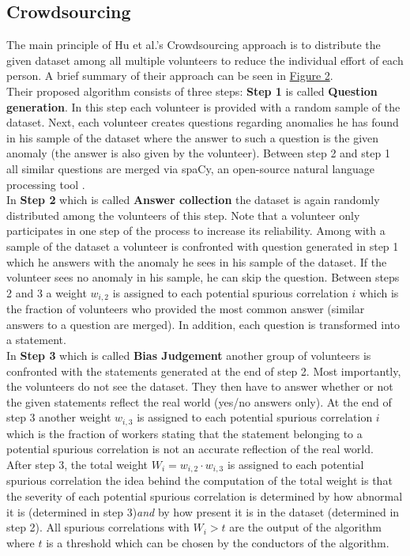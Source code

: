 \documentclass{article}
\begin{document}
\subsection{Crowdsourcing}
The main principle of Hu et al.'s Crowdsourcing approach \cite{10.1145/3366423.3380063} is to distribute the given dataset among all multiple volunteers to reduce the individual effort of each person. A brief summary of their approach can be seen in \hyperref[fig:crowdsourcing]{Figure 2}. \\
Their proposed algorithm consists of three steps: \textbf{Step 1} is called \textbf{Question generation}. In this step each volunteer is provided with a random sample of the dataset. Next, each volunteer creates questions regarding anomalies he has found in his sample of the dataset where the answer to such a question is the given anomaly (the answer is also given by the volunteer). Between step 2 and step 1 all similar questions are merged via spaCy, an open-source natural language processing tool \cite{spaCy}. \\
In \textbf{Step 2} which is called \textbf{Answer collection} the dataset is again randomly distributed among the volunteers of this step. Note that a volunteer only participates in one step of the process to increase its reliability. Among with a sample of the dataset a volunteer is confronted with question generated in step 1 which he answers with the anomaly he sees in his sample of the dataset. If the volunteer sees no anomaly in his sample, he can skip the question. Between steps 2 and 3 a weight $w_{i,2}$ is assigned to each potential spurious correlation $i$ which is the fraction of volunteers who provided the most common answer (similar answers to a question are merged). In addition, each question is transformed into a statement. \\
In \textbf{Step 3} which is called \textbf{Bias Judgement} another group of volunteers is confronted with the statements generated at the end of step 2. Most importantly, the volunteers do not see the dataset. They then have to answer whether or not the given statements reflect the real world (yes/no answers only). At the end of step 3 another weight $w_{i,3}$ is assigned to each potential spurious correlation $i$ which is the fraction of workers stating that the statement belonging to a potential spurious correlation is not an accurate reflection of the real world. \\
After step 3, the total weight $W_{i}=w_{i,2} \cdot w_{i,3}$ is assigned to each potential spurious correlation the idea behind the computation of the total weight is that the severity of each potential spurious correlation is determined by how abnormal it is (determined in step 3)\textit{and} by how present it is in the dataset (determined in step 2). All spurious correlations with $W_i > t$ are the output of the algorithm where $t$ is a threshold which can be chosen by the conductors of the algorithm. \\
\end{document}

